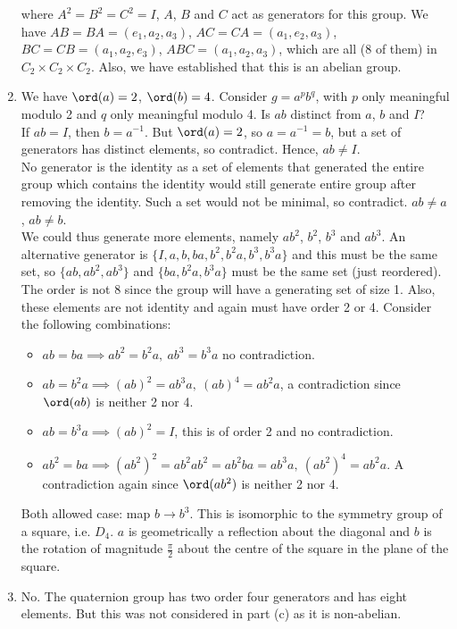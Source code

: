 \documentclass[a4paper]{article}
\begin{document}
\begin{ans}
\begin{enumerate}[label=(\alph*)]
where $A^2=B^2=C^2=I$, $A$, $B$ and $C$ act as generators for this group. We have $AB=BA=(e_1,a_2,a_3)$, $AC=CA=(a_1,e_2,a_3)$, $BC=CB=(a_1,a_2,e_3)$, $ABC=(a_1,a_2,a_3)$, which are all (8 of them) in $C_2\times C_2\times C_2$. Also, we have established that this is an abelian group.
\item We have $\ord(a)=2$, $\ord(b)=4$. Consider $g=a^pb^q$, with $p$ only meaningful modulo 2 and $q$ only meaningful modulo 4. Is $ab$ distinct from $a$, $b$ and $I$?\\[5pt]
If $ab=I$, then $b=a^{-1}$. But $\ord(a)=2$, so $a=a^{-1}=b$, but a set of generators has distinct elements, so contradict. Hence, $ab\neq I$.\\[5pt]
No generator is the identity as a set of elements that generated the entire group which contains the identity would still generate entire group after removing the identity. Such a set would not be minimal, so contradict. $ab\neq a$, $ab\neq b$.\\[5pt]
We could thus generate more elements, namely $ab^2$, $b^2$, $b^3$ and $ab^3$. An alternative generator is $\{I,a,b,ba,b^2,b^2a,b^3,b^3a\}$ and this must be the same set, so $\{ab,ab^2,ab^3\}$ and $\{ba,b^2a,b^3a\}$ must be the same set (just reordered). The order is not 8 since the group will have a generating set of size 1. Also, these elements are not identity and again must have order 2 or 4. Consider the following combinations:
\begin{itemize}
    \item $ab=ba\implies ab^2=b^2a,~ab^3=b^3a$ no contradiction.
    \item $ab=b^2a\implies(ab)^2=ab^3a,~(ab)^4=ab^2a$, a contradiction since $\ord(ab)$ is neither 2 nor 4.
    \item $ab=b^3a\implies (ab)^2=I$, this is of order 2 and no contradiction.
    \item $ab^2=ba\implies(ab^2)^2=ab^2ab^2=ab^2ba=ab^3a,~(ab^2)^4=ab^2a$. A contradiction again since $\ord(ab^2)$ is neither 2 nor 4.
\end{itemize}
Both allowed case: map $b\rightarrow b^3$. This is isomorphic to the symmetry group of a square, i.e. $D_4$. $a$ is geometrically a reflection about the diagonal and $b$ is the rotation of magnitude $\frac{\pi}{2}$ about the centre of the square in the plane of the square.
\item No. The quaternion group has two order four generators and has eight elements. But this was not considered in part (c) as it is non-abelian.
\end{enumerate}
\end{ans}
\end{document}
